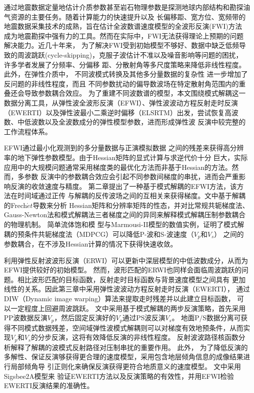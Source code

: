 \begin{cabstract}
	通过地震数据定量地估计介质参数甚至岩石物理参数是探测地球内部结构和勘探油气资源的主要任务。随着计算能力的快速提升以及
	长偏移距、宽方位、宽频带的地震数据采集技术的成熟，旨在估计全波数谱速度模型的全波形反演(FWI)方法
	成为地震勘探中强有力的工具。然而在实际中，FWI无法获得理论上预期的问题解决能力。近几十年来，
	为了解决FWI受到初始模型不够好、数据中缺乏低频导致的周波跳跃(cycle-skipping)，克服子波估计不准以及噪音影响等问题的困扰，
	许多学者发展了分频率、分偏移
	距、分散射角等多尺度策略来降低非线性程度。此外，在弹性介质中，
	不同波模式转换及其他多分量数据的复杂性
	进一步增加了反问题的非线性程度，而且
	不同参数扰动的偏导数波场在特定散射角范围内的重叠还会导致参数耦合效应。
	为了重建不同波数谱的模型，本文围绕模式解耦这一数据分离工具，从弹性波全波形反演（EFWI）、弹性波波动方程反射走时反演
	（EWERTI）以及弹性波最小二乘逆时偏移（ELSRTM）出发，尝试恢复高波数、中低波数以及全波数成分的弹性模型参数，进而形成弹性波
	反演中较完整的工作流程体系。

	EFWI通过最小化观测到的多分量数据与正演模拟数据
	之间的残差来获得高分辨率的地下弹性参数模型。由于Hessian矩阵的显式计算与求逆代价十分
	巨大，实际应用中的大规模问题通常采用梯度类的最优化方法而非基于Hessian的方法。然而，多参数
	反演中的参数耦合效应会引起不同参数间梯度的串扰，进而会严重影响反演的收敛速度与精度。
	第二章提出了一种基于模式解耦的EFWI方法，该方法在时间域通过正传
	与解耦的反传波场之间的互相关来获得梯度。文中基于解耦的Frech$\acute{e}t$导数来分析
	Hessian矩阵和分辨率矩阵的性态，并对比常规共轭梯度法、Gauss-Newton法和模式解耦法三者梯度之间的异同来解释模式解耦压制参数耦合的物理机制。
	简单流体饱和模
	型与Marmousi-II模型的数值实例，证明了模式解耦的预条件共轭梯度法（MDPCG）可以降低P-波和S-波速度（$V_p$和$V_s$）
	之间的参数耦合，在不涉及Hessian计算的情况下获得快速收敛。

	利用弹性反射波波形反演（ERWI）可以更新中深层模型的中低波数成分，从而为EFWI提供较好的初始模型。
	然而，波形匹配的ERWI也同样会面临周波跳跃的问题。相比波形匹配的目标函数，反射走时目标函数与背景速度模型之间具有
	更加线性的关系。因此第三章中采用弹性波波动方程反射走时反演（EWERTI），
	通过DIW（Dynamic image warping）算法来提取走时残差并以此建立目标函数，
	可以一定程度上回避周波跳跃。
	文中采用基于模式解耦的两步反演策略，首先采用PP波数据反演$V_p$，然后固定反演好的$V_p$通过PS波反演$V_s$。
	地面P/S数据分离可获得不同模式数据残差，空间域弹性波模式解耦则可以对梯度有效地预条件，从而实现$V_p$和$V_s$的分步反演，这将有效降低反演的非线性程度。
	反射波波路径核函数分析解释了解耦的波模式反射路径对压制串扰的重要作用。
	此外，
	为了降低反演的多解性、保证反演够获得更合理的速度模型，采用包含地层倾角信息的成像结果进行局部倾角导
	引正则化来确保反演获得更符合地质意义的速度模型。
	文中采用Sigsbee2A模型来
	验证EWERTI方法以及反演策略的有效性，并用EFWI检验EWERTI反演结果的准确性。


\end{cabstract}
